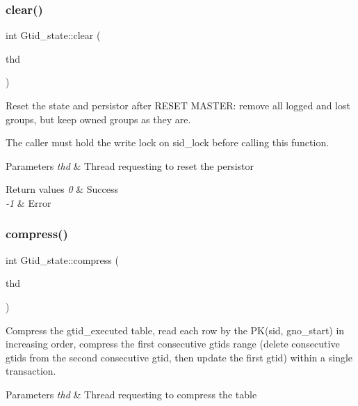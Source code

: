 \subsubsection{\texorpdfstring{clear()}{clear()}}
{\footnotesize\ttfamily int Gtid\+\_\+state\+::clear (\begin{DoxyParamCaption}\item[{T\+HD $\ast$}]{thd }\end{DoxyParamCaption})}

Reset the state and persistor after R\+E\+S\+ET M\+A\+S\+T\+ER\+: remove all logged and lost groups, but keep owned groups as they are.

The caller must hold the write lock on sid\+\_\+lock before calling this function.


\begin{DoxyParams}{Parameters}
{\em thd} & Thread requesting to reset the persistor\\
\hline
\end{DoxyParams}

\begin{DoxyRetVals}{Return values}
{\em 0} & Success \\
\hline
{\em -\/1} & Error \\
\hline
\end{DoxyRetVals}
\mbox{\label{classGtid__state_a731a0566657e636fb597085ca0ec87a4}} 
\subsubsection{\texorpdfstring{compress()}{compress()}}
{\footnotesize\ttfamily int Gtid\+\_\+state\+::compress (\begin{DoxyParamCaption}\item[{T\+HD $\ast$}]{thd }\end{DoxyParamCaption})}

Compress the gtid\+\_\+executed table, read each row by the P\+K(sid, gno\+\_\+start) in increasing order, compress the first consecutive gtids range (delete consecutive gtids from the second consecutive gtid, then update the first gtid) within a single transaction.


\begin{DoxyParams}{Parameters}
{\em thd} & Thread requesting to compress the table\\
\hline
\end{DoxyParams}


